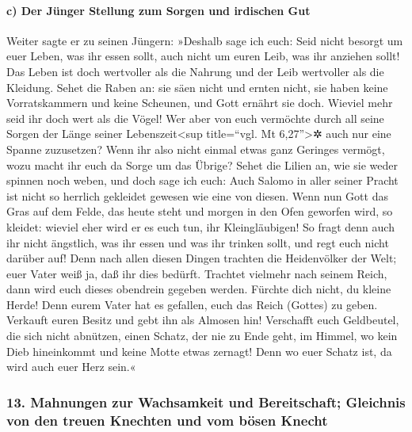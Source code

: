 \hypertarget{c-der-juxfcnger-stellung-zum-sorgen-und-irdischen-gut}{%
\paragraph{c) Der Jünger Stellung zum Sorgen und irdischen
Gut}\label{c-der-juxfcnger-stellung-zum-sorgen-und-irdischen-gut}}

 Weiter sagte er zu seinen Jüngern: »Deshalb sage ich
euch: Seid nicht besorgt um euer Leben, was ihr essen sollt, auch nicht
um euren Leib, was ihr anziehen sollt!  Das Leben ist
doch wertvoller als die Nahrung und der Leib wertvoller als die
Kleidung.  Sehet die Raben an: sie säen nicht und ernten
nicht, sie haben keine Vorratskammern und keine Scheunen, und Gott
ernährt sie doch. Wieviel mehr seid ihr doch wert als die Vögel!
 Wer aber von euch vermöchte durch all seine Sorgen der
Länge seiner Lebenszeit\textless sup title=``vgl. Mt 6,27''\textgreater✲
auch nur eine Spanne zuzusetzen?  Wenn ihr also nicht
einmal etwas ganz Geringes vermögt, wozu macht ihr euch da Sorge um das
Übrige?  Sehet die Lilien an, wie sie weder spinnen noch
weben, und doch sage ich euch: Auch Salomo in aller seiner Pracht ist
nicht so herrlich gekleidet gewesen wie eine von diesen. 
Wenn nun Gott das Gras auf dem Felde, das heute steht und morgen in den
Ofen geworfen wird, so kleidet: wieviel eher wird er es euch tun, ihr
Kleingläubigen!  So fragt denn auch ihr nicht ängstlich,
was ihr essen und was ihr trinken sollt, und regt euch nicht darüber
auf!  Denn nach allen diesen Dingen trachten die
Heidenvölker der Welt; euer Vater weiß ja, daß ihr dies bedürft.
 Trachtet vielmehr nach seinem Reich, dann wird euch
dieses obendrein gegeben werden.  Fürchte dich nicht, du
kleine Herde! Denn eurem Vater hat es gefallen, euch das Reich (Gottes)
zu geben.  Verkauft euren Besitz und gebt ihn als Almosen
hin! Verschafft euch Geldbeutel, die sich nicht abnützen, einen Schatz,
der nie zu Ende geht, im Himmel, wo kein Dieb hineinkommt und keine
Motte etwas zernagt!  Denn wo euer Schatz ist, da wird
auch euer Herz sein.«

\hypertarget{mahnungen-zur-wachsamkeit-und-bereitschaft-gleichnis-von-den-treuen-knechten-und-vom-buxf6sen-knecht}{%
\subsubsection{13. Mahnungen zur Wachsamkeit und Bereitschaft; Gleichnis
von den treuen Knechten und vom bösen
Knecht}\label{mahnungen-zur-wachsamkeit-und-bereitschaft-gleichnis-von-den-treuen-knechten-und-vom-buxf6sen-knecht}}

